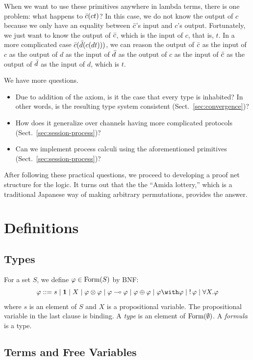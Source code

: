 When we want to use these primitives anywhere in lambda terms,
there is one problem: what happens to $\bar{c}(c t)$?
In this case, we do not know the output of $c$ because we only have an
equality between $\bar{c}$'s input and $c$'s output.
Fortunately, we just want to know the output of $\bar{c}$, which is the
input of $c$, that is, $t$.
In a more complicated case $\bar{c}(\bar{d}(c (d t)))$,
we can reason the output of $\bar{c}$ as the input of $c$ as the output of
$d$ as the input of $\bar{d}$ as the output of $c$ as the input of $\bar{c}$
as the output of $\bar{d}$ as the input of $d$, which is $t$.

We have more questions.
\begin{itemize}
 \item Due to addition of the axiom, is it the case that
       every type is inhabited?  In other words,
      is the resulting type system consistent (Sect.~\ref{sec:convergence})?
 \item How does it generalize over channels having more complicated
       protocols (Sect.~\ref{sec:session-process})?
 \item Can we implement process calculi using the aforementioned
       primitives (Sect.~\ref{sec:session-process})?
\end{itemize}

After following these practical questions,
we proceed to developing a proof net structure for the logic.
It turns out that the the ``Amida lottery,'' which is a traditional
Japanese way of making arbitrary permutations, provides the answer.



\section{Definitions}

\subsection{Types}
For a set $S$, we define $\varphi\in\mathop{\text{Form}}(S)$ by BNF:
\[
 \phi::=s\mid \one \mid X \mid \phi\otimes\phi\mid \phi\limp\phi\mid
 \phi\oplus\phi\mid \phi\with\phi\mid \bang\phi\mid \forall X.\phi
\]
where $s$ is an element of $S$ and $X$ is a propositional variable.
The propositional variable in the last clause is binding.
A \textit{type} is an element of $\mathop{\text{Form}}(\emptyset)$.
A \textit{formula} is a type.

\subsection{Terms and Free Variables}

